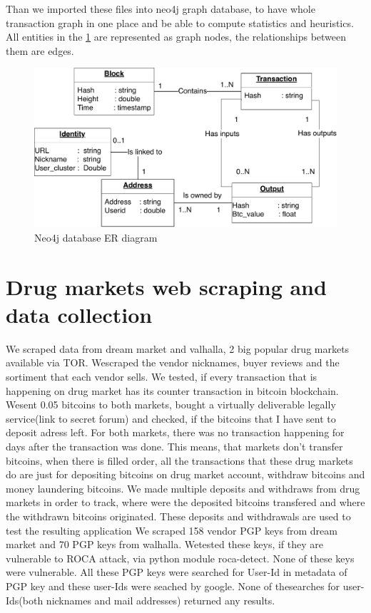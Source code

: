 \documentclass[
  digital, %
  table,   %
  lof,     %
  lot,     %
  oneside
]{fithesis3}
\begin{document}
Than we imported these files into neo4j graph database, to have whole transaction graph in one place and be able to compute statistics and heuristics.
All entities in the \ref{neo4jschema} are represented as graph nodes, the relationships between them are edges.
\begin{figure}[!htb]
    \centering
    \includegraphics[width=1\textwidth]{neo4j-schema}
    \caption{Neo4j database ER diagram}
    \label{neo4jschema}
\end{figure}

\section{Drug markets web scraping and data collection}
We scraped data from dream market and valhalla, 2 big popular drug markets available via TOR. Wescraped the vendor nicknames, buyer reviews and the sortiment that each vendor sells.
We tested, if every transaction that is happening on drug market has its counter transaction in bitcoin blockchain. Wesent 0.05 bitcoins to both markets,
bought a virtually deliverable legally service(link to secret forum) and checked, if the bitcoins that I have sent to deposit adress left.
For both markets, there was no transaction happening for days after the transaction was done. This means, that markets don't transfer bitcoins,
when there is filled order, all the transactions that these drug markets do are just for depositing bitcoins on drug market account,
withdraw bitcoins and money laundering bitcoins.
We made multiple deposits and withdraws from drug markets in order to track, where were the deposited bitcoins transfered and where the withdrawn bitcoins originated.
These deposits and withdrawals are used to test the resulting application
We scraped 158 vendor PGP keys from dream market and 70 PGP keys from walhalla. Wetested these keys, if they are vulnerable to ROCA attack, via python module roca-detect. None of these keys were vulnerable.
All these PGP keys were searched for User-Id in metadata of PGP key and these user-Ids were seached by google. None of thesearches for user-Ids(both nicknames and mail addresses) returned any results.
\end{document}
